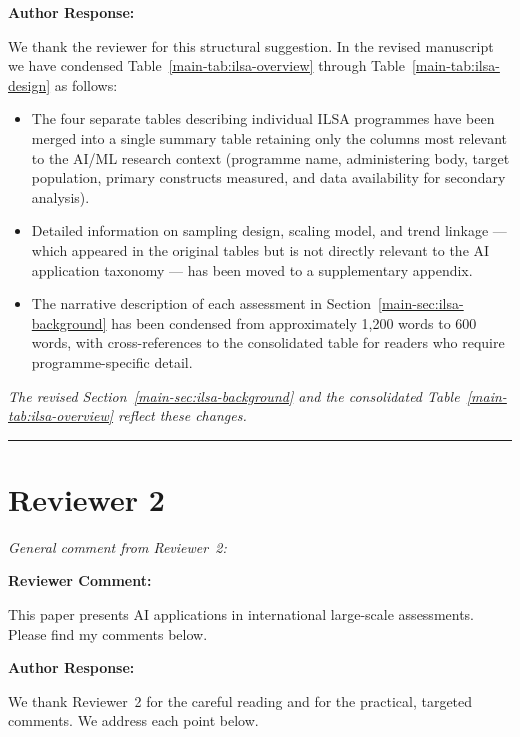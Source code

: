 \documentclass[12pt, a4paper]{article}
\newcommand{\R}[1]{Section~\ref{main-#1}}
\newcommand{\Rt}[1]{Table~\ref{main-#1}}
\newenvironment{reviewercomment}{%
  \begin{mdframed}[linecolor=reviewercolor, linewidth=1.5pt,
    backgroundcolor=reviewercolor!6, innertopmargin=8pt, innerbottommargin=8pt]
  \color{reviewercolor}\textbf{Reviewer Comment:}\normalcolor\par\smallskip
}{%
  \end{mdframed}\medskip
}
\newenvironment{authorresponse}{%
  \begin{mdframed}[linecolor=authorcolor, linewidth=1pt,
    backgroundcolor=authorcolor!5, innertopmargin=8pt, innerbottommargin=8pt]
  \color{authorcolor}\textbf{Author Response:}\normalcolor\par\smallskip
}{%
  \end{mdframed}\bigskip
}
\newcommand{\changed}[1]{\textcolor{changedcolor}{\textit{#1}}}
\begin{document}
\begin{authorresponse}
We thank the reviewer for this structural suggestion. In the revised
manuscript we have condensed \Rt{tab:ilsa-overview} through
\Rt{tab:ilsa-design} as follows:
\begin{itemize}[leftmargin=*]
  \item The four separate tables describing individual ILSA programmes
    have been merged into a single summary table retaining only the
    columns most relevant to the AI/ML research context (programme name,
    administering body, target population, primary constructs measured,
    and data availability for secondary analysis).
  \item Detailed information on sampling design, scaling model, and trend
    linkage --- which appeared in the original tables but is not directly
    relevant to the AI application taxonomy --- has been moved to a
    supplementary appendix.
  \item The narrative description of each assessment in \R{sec:ilsa-background}
    has been condensed from approximately 1,200 words to 600 words, with
    cross-references to the consolidated table for readers who require
    programme-specific detail.
\end{itemize}

\changed{The revised \R{sec:ilsa-background} and the consolidated
\Rt{tab:ilsa-overview} reflect these changes.}
\end{authorresponse}

\bigskip
\hrule
\bigskip

\section*{Reviewer 2}

\noindent\textit{General comment from Reviewer~2:}

\begin{reviewercomment}
This paper presents AI applications in international large-scale
assessments. Please find my comments below.
\end{reviewercomment}

\begin{authorresponse}
We thank Reviewer~2 for the careful reading and for the practical,
targeted comments. We address each point below.
\end{authorresponse}
\end{document}
